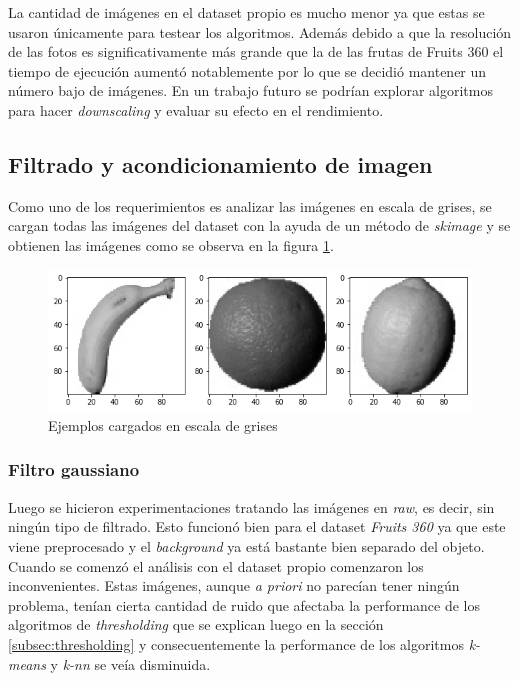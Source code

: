 \documentclass[10pt, a4paper]{article}
\begin{document}
La cantidad de imágenes en el dataset propio es mucho menor ya que estas se usaron únicamente para testear los algoritmos. Además debido a que la resolución de las fotos es significativamente más grande que la de las frutas de Fruits 360 el tiempo de ejecución aumentó notablemente por lo que se decidió mantener un número bajo de imágenes. En un trabajo futuro se podrían explorar algoritmos para hacer \textit{downscaling} y evaluar su efecto en el rendimiento.

\subsection{Filtrado y acondicionamiento de imagen}
\label{sec:filter_thresh}

Como uno de los requerimientos es analizar las imágenes en escala de grises, se cargan todas las imágenes del dataset con la ayuda de un método de \textit{skimage} y se obtienen las imágenes como se observa en la figura \ref{fig:dataset_sample_gray}.

\begin{figure}[h]
    \centering
    \includegraphics[width=\textwidth]{imgs/dataset_sample_gray.png}
    \caption{Ejemplos cargados en escala de grises }
    \label{fig:dataset_sample_gray}
\end{figure}{}

\subsubsection{Filtro gaussiano}

Luego se hicieron experimentaciones tratando las imágenes en \textit{raw}, es decir, sin ningún tipo de filtrado. Esto funcionó bien para el dataset \textit{Fruits 360} ya que este viene preprocesado y el \textit{background} ya está bastante bien separado del objeto. Cuando se comenzó el análisis con el dataset propio comenzaron los inconvenientes. Estas imágenes, aunque \textit{a priori} no parecían tener ningún problema, tenían cierta cantidad de ruido que afectaba la performance de los algoritmos de \textit{thresholding} que se explican luego en la sección \ref{subsec:thresholding} y consecuentemente la performance de los algoritmos \textit{k-means} y \textit{k-nn} se veía disminuida.
\end{document}
